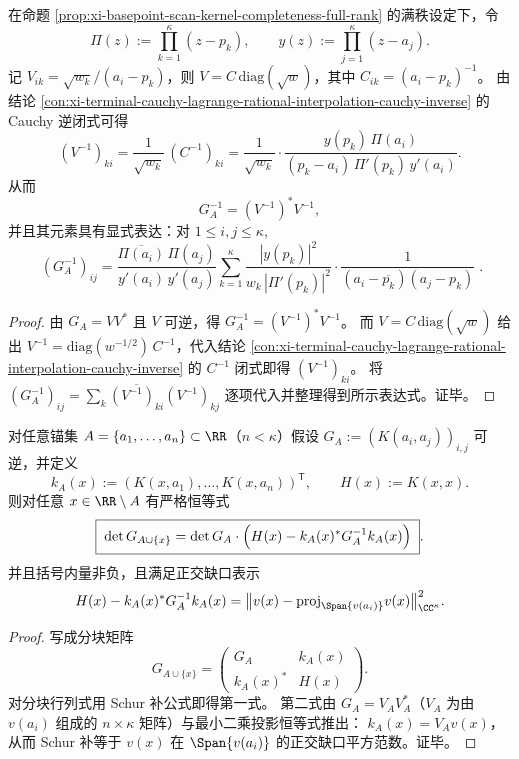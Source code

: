 \begin{proposition}\label{prop:xi-basepoint-scan-gram-inverse-closed-form}
在命题 \ref{prop:xi-basepoint-scan-kernel-completeness-full-rank} 的满秩设定下，令
\[
\Pi(z):=\prod_{k=1}^{\kappa}(z-p_k),\qquad
y(z):=\prod_{j=1}^{\kappa}(z-a_j).
\]
记 \(V_{ik}=\sqrt{w_k}/(a_i-p_k)\)，则 \(V=C\,\mathrm{diag}(\sqrt w)\)，其中 \(C_{ik}=(a_i-p_k)^{-1}\)。
由结论 \ref{con:xi-terminal-cauchy-lagrange-rational-interpolation-cauchy-inverse} 的 Cauchy 逆闭式可得
\[
(V^{-1})_{k i}
=\frac{1}{\sqrt{w_k}}\,(C^{-1})_{k i}
=\frac{1}{\sqrt{w_k}}\cdot
\frac{y(p_k)\,\Pi(a_i)}{(p_k-a_i)\,\Pi'(p_k)\,y'(a_i)}.
\]
从而
\[
G_A^{-1}=(V^{-1})^\ast V^{-1},
\]
并且其元素具有显式表达：对 \(1\le i,j\le \kappa\),
\[
\boxed{\;
(G_A^{-1})_{ij}
=
\frac{\overline{\Pi(a_i)}\,\Pi(a_j)}{y'(a_i)\,y'(a_j)}
\sum_{k=1}^{\kappa}
\frac{|y(p_k)|^2}{w_k\,|\Pi'(p_k)|^2}\cdot
\frac{1}{(a_i-\overline{p_k})(a_j-p_k)}\; }.
\]
\end{proposition}
\begin{proof}
由 \(G_A=VV^\ast\) 且 \(V\) 可逆，得 \(G_A^{-1}=(V^{-1})^\ast V^{-1}\)。
而 \(V=C\,\mathrm{diag}(\sqrt w)\) 给出 \(V^{-1}=\mathrm{diag}(w^{-1/2})\,C^{-1}\)，代入结论 \ref{con:xi-terminal-cauchy-lagrange-rational-interpolation-cauchy-inverse} 的 \(C^{-1}\) 闭式即得 \((V^{-1})_{ki}\)。
将
\(
(G_A^{-1})_{ij}=\sum_{k}\overline{(V^{-1})_{ki}}(V^{-1})_{kj}
\)
逐项代入并整理得到所示表达式。证毕。
\end{proof}

\begin{proposition}\label{prop:xi-basepoint-scan-gram-determinant-schur-increment}
对任意锚集 \(A=\{a_1,\dots,a_n\}\subset\RR\)（\(n<\kappa\)）假设 \(G_A:=(K(a_i,a_j))_{i,j}\) 可逆，并定义
\[
k_A(x):=(K(x,a_1),\dots,K(x,a_n))^{\mathsf T},\qquad
H(x):=K(x,x).
\]
则对任意 \(x\in\RR\setminus A\) 有严格恒等式
\[
\boxed{\;
\det G_{A\cup\{x\}}=\det G_A\cdot\Bigl(H(x)-k_A(x)^\ast G_A^{-1}k_A(x)\Bigr)\; } .
\]
并且括号内量非负，且满足正交缺口表示
\[
H(x)-k_A(x)^\ast G_A^{-1}k_A(x)
=\bigl\|v(x)-\mathrm{proj}_{\Span\{v(a_i)\}}v(x)\bigr\|_{\CC^\kappa}^{2}.
\]
\end{proposition}
\begin{proof}
写成分块矩阵
\[
G_{A\cup\{x\}}=
\begin{pmatrix}
G_A & k_A(x)\\
k_A(x)^\ast & H(x)
\end{pmatrix}.
\]
对分块行列式用 Schur 补公式即得第一式。
第二式由 \(G_A=V_AV_A^\ast\)（\(V_A\) 为由 \(v(a_i)\) 组成的 \(n\times\kappa\) 矩阵）与最小二乘投影恒等式推出：
\(
k_A(x)=V_A v(x)
\)，从而 Schur 补等于 \(v(x)\) 在 \(\Span\{v(a_i)\}\) 的正交缺口平方范数。证毕。
\end{proof}

